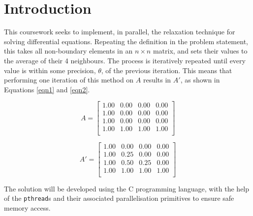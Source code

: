 \section{Introduction}

This coursework seeks to implement, in parallel, the relaxation technique for solving differential equations. Repeating the definition in the problem statement, this takes all non-boundary elements in an $n\times n$ matrix, and sets their values to the average of their 4 neighbours. The process is iteratively repeated until every value is within some precision, $\theta$, of the previous iteration. This means that performing one iteration of this method on $A$ results in $A'$, as shown in Equations \ref{eqn1} and \ref{eqn2}.

\begin{equation} \label{eqn1}
A=\begin{bmatrix}
1.00 & 0.00 & 0.00 & 0.00\\
1.00 & 0.00 & 0.00 & 0.00\\
1.00 & 0.00 & 0.00 & 0.00\\
1.00 & 1.00 & 1.00 & 1.00\\
\end{bmatrix}
\end{equation}

\begin{equation} \label{eqn2}
A'=\begin{bmatrix}
1.00 & 0.00 & 0.00 & 0.00\\
1.00 & 0.25 & 0.00 & 0.00\\
1.00 & 0.50 & 0.25 & 0.00\\
1.00 & 1.00 & 1.00 & 1.00\\
\end{bmatrix}
\end{equation}

The solution will be developed using the C programming language, with the help of the \texttt{pthread}s and their associated parallelisation primitives to ensure safe memory access.

